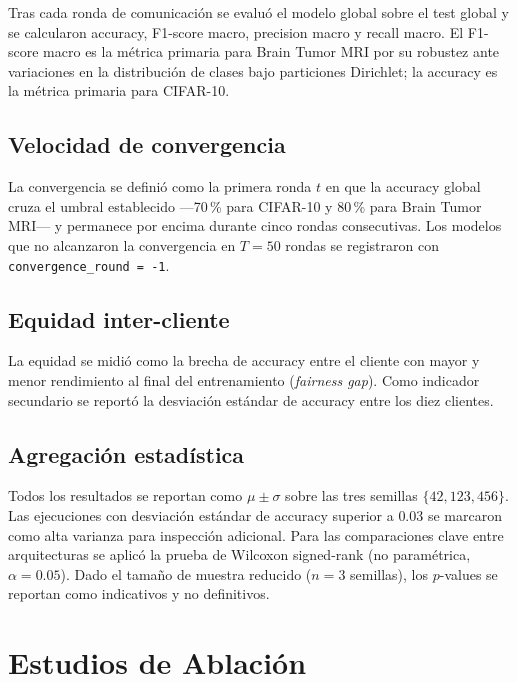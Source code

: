 Tras cada ronda de comunicación se evaluó el modelo global sobre el test global y se
calcularon accuracy, F1-score macro, precision macro y recall macro. El F1-score macro es la
métrica primaria para Brain Tumor MRI por su robustez ante variaciones en la distribución
de clases bajo particiones Dirichlet; la
accuracy es la métrica primaria para CIFAR-10.

\subsection{Velocidad de convergencia}

La convergencia se definió como la primera ronda $t$ en que la accuracy global cruza el
umbral establecido —70\,\% para CIFAR-10 y 80\,\% para Brain Tumor MRI— y permanece por
encima durante cinco rondas consecutivas. Los modelos que no alcanzaron la convergencia en
$T = 50$ rondas se registraron con \texttt{convergence\_round = -1}.

\subsection{Equidad inter-cliente}

La equidad se midió como la brecha de accuracy entre el cliente con mayor y menor rendimiento
al final del entrenamiento (\textit{fairness gap}). Como indicador secundario se reportó la
desviación estándar de accuracy entre los diez clientes.

\subsection{Agregación estadística}

Todos los resultados se reportan como $\mu \pm \sigma$ sobre las tres semillas $\{42, 123,
456\}$. Las ejecuciones con desviación estándar de accuracy superior a $0.03$ se marcaron
como alta varianza para inspección adicional. Para las comparaciones clave entre
arquitecturas se aplicó la prueba de Wilcoxon signed-rank (no paramétrica, $\alpha = 0.05$).
Dado el tamaño de muestra reducido ($n = 3$ semillas), los $p$-values se reportan como
indicativos y no definitivos.

\section{Estudios de Ablación}

